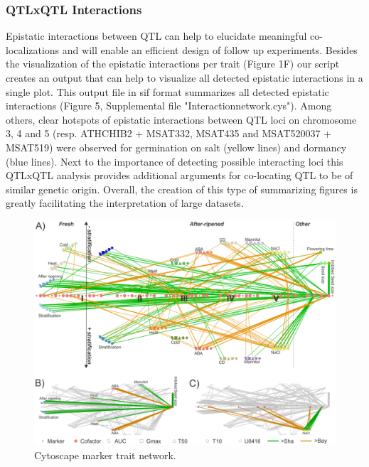 \subsubsection{QTLxQTL Interactions}
Epistatic interactions between QTL can help to elucidate meaningful co-localizations and will enable an 
efficient design of follow up experiments. Besides the visualization of the epistatic interactions per 
trait (Figure 1F) our script creates an output that can help to visualize all detected epistatic 
interactions in a single plot. This output file in sif format summarizes all detected epistatic 
interactions (Figure 5, Supplemental file "Interactionnetwork.cys"). Among others, clear hotspots of 
epistatic interactions between QTL loci on chromosome 3, 4 and 5 (resp. ATHCHIB2 + MSAT332, MSAT435 and 
MSAT520037 + MSAT519) were observed for germination on salt (yellow lines) and dormancy (blue lines). 
Next to the importance of detecting possible interacting loci this QTLxQTL analysis provides additional 
arguments for co-locating QTL to be of similar genetic origin. Overall, the creation of this type of 
summarizing figures is greatly facilitating the interpretation of large datasets.

\begin{figure}[h!]
  \centering
  \includegraphics[keepaspectratio,scale=0.30]{eps/image_3_1_5.eps}
  \caption[Cytoscape marker trait network.]
    {Cytoscape marker trait network.}
\end{figure}

